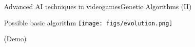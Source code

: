 \documentclass[10pt,compress]{beamer} %
\begin{document}
\begin{frame}{Advanced AI techniques in videogames}{Genetic Algorithms (II)} 
	\begin{center}
		Possible basic algorithm
		\texttt{[image: figs/evolution.png]}
	\end{center}
	\href{http://rednuht.org/genetic_cars_2/}{(Demo)}
\end{frame}
\end{document}
